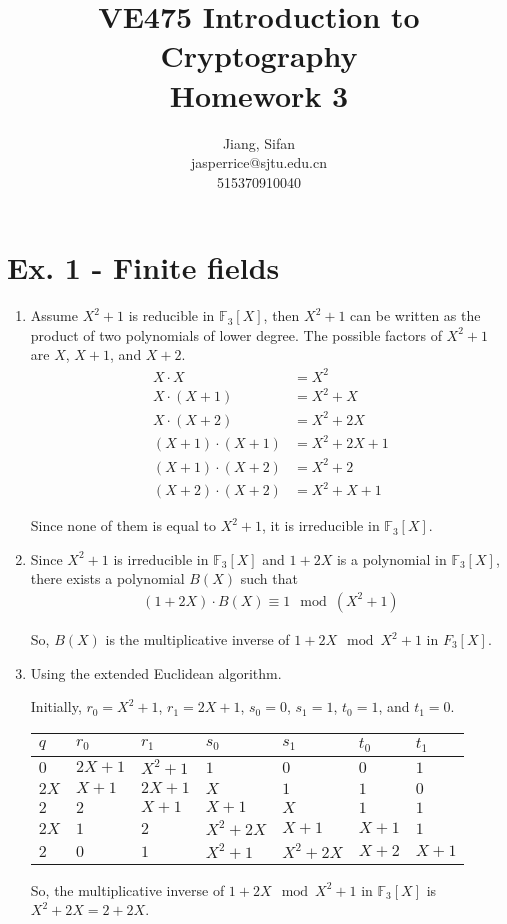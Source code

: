 \documentclass[11pt,a4paper]{article}
\title{
	VE475 Introduction to Cryptography \\
	Homework 3
}
\author{
	Jiang, Sifan\\
	jasperrice@sjtu.edu.cn\\
	515370910040
}
\begin{document}
\maketitle


\section*{Ex. 1 - Finite fields}
\begin{enumerate}
	\item Assume $X^{2} + 1$ is reducible in $\mathbb{F}_{3}[X]$, then $X^{2} + 1$ can be written as the product of two polynomials of lower degree. The possible factors of $X^{2} + 1$ are $X$, $X + 1$, and $X + 2$.
		\begin{align*}
			X \cdot X &= X^{2}\\
			X \cdot (X + 1) &= X^{2} + X \\
			X \cdot (X + 2) &= X^{2} + 2X \\
			(X + 1) \cdot (X + 1) &= X^{2} + 2X + 1 \\
			(X + 1) \cdot (X + 2) &= X^{2} + 2 \\
			(X + 2) \cdot (X + 2) &= X^{2} + X + 1
		\end{align*}
	\par Since none of them is equal to $X^{2} + 1$, it is irreducible in $\mathbb{F}_{3}[X]$.

	\item Since $X^{2} + 1$ is irreducible in $\mathbb{F}_{3}[X]$ and $1 + 2X$ is a polynomial in $\mathbb{F}_{3}[X]$, there exists a polynomial $B(X)$ such that
		\begin{align*}
			(1 + 2X) \cdot B(X) \equiv 1 \mod (X^{2} + 1)
		\end{align*}
	\par So, $B(X)$ is the multiplicative inverse of $1 + 2X \mod X^{2} + 1$ in $F_{3}[X]$.
	
	\item Using the extended Euclidean algorithm.
	\par Initially, $r_{0}=X^{2}+1$, $r_{1}=2X+1$, $s_{0} = 0$, $s_{1} = 1$, $t_{0} = 1$, and $t_{1} = 0$.
		\begin{table}[!ht]
			\centering
			\begin{tabular}{lll|llll}
					$q$ & $r_{0}$ & $r_{1}$ & $s_{0}$ & $s_{1}$ & $t_{0}$ & $t_{1}$ \\
					\hline
					$0$ & $2X+1$ & $X^{2}+1$ & $1$ & $0$ & $0$ & $1$ \\
					$2X$ & $X+1$ & $2X+1$ & $X$ & $1$ & $1$ & $0$ \\
					$2$ & $2$ & $X+1$ & $X+1$ & $X$ & $1$ & $1$ \\
					$2X$ & $1$ & $2$ & $X^{2}+2X$ & $X+1$ & $X+1$ & $1$ \\
					$2$ & $0$ & $1$ & $X^{2}+1$ & $X^{2}+2X$ & $X+2$ & $X+1$
			\end{tabular}
		\end{table}
	\par So, the multiplicative inverse of $1+2X \mod X^{2}+1$ in $\mathbb{F}_{3}[X]$ is $X^{2}+2X = 2+2X$.
\end{enumerate}
\end{document}
